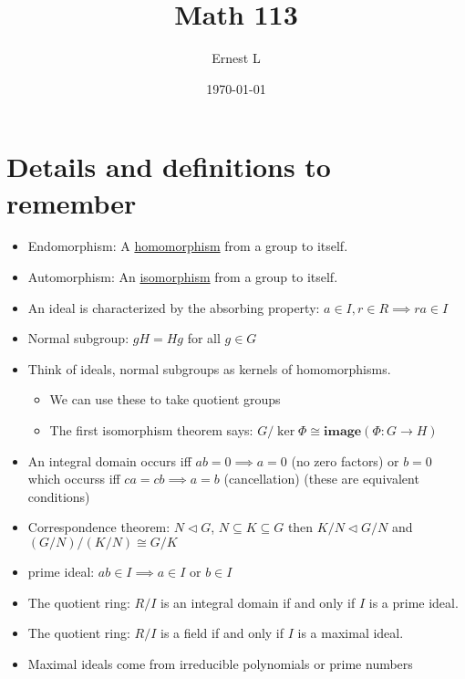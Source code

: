 \documentclass[11pt]{article}
\author{Ernest L}
\date{\today}
\title{Math 113}
\begin{document}
\maketitle
\section{Details and definitions to remember}

\begin{itemize}
    \item Endomorphism: A \underline{homomorphism} from a group to itself.
    \item Automorphism: An \underline{isomorphism} from a group to itself.
    \item An ideal is characterized by the absorbing property: $a \in I, r \in R \implies ra \in I$
    \item Normal subgroup: $gH = Hg$ for all $g \in G$
    \item Think of ideals, normal subgroups as kernels of homomorphisms.
    \begin{itemize}
        \item We can use these to take quotient groups 
        \item The first isomorphism theorem says: $G/\ker \Phi \cong \textbf{image} (\Phi: G \to H)$
    \end{itemize}
    \item An integral domain occurs iff $ab = 0 \implies a = 0$ (no zero factors) or $b = 0$ which occurss iff $ca = cb \implies a = b$ (cancellation) (these are equivalent conditions)
    \item Correspondence theorem: $N \triangleleft G$, $N \subseteq K \subseteq G$ then $K/N \triangleleft G/N$ and $(G/N)/(K/N) \cong G/K$
    \item prime ideal: $ab \in I \implies a \in I$ or $b \in I$
    \item The quotient ring: $R / I$ is an integral domain if and only if $I$ is a prime ideal.
    \item The quotient ring: $R / I$ is a field if and only if $I$ is a maximal ideal.
    \item Maximal ideals come from irreducible polynomials or prime numbers
\end{itemize}

\newpage
\end{document}
